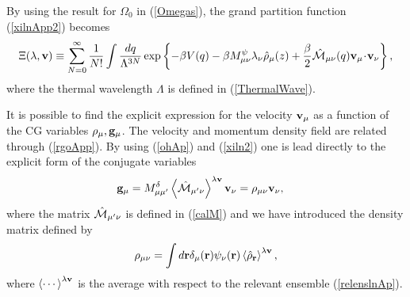 \documentclass[b5paper,openright,10pt]{book}
\newcommand{\esc}{\!\cdot\!}
\newcommand{\llangle}{\left\langle}
\newcommand{\rrangle}{\right\rangle}
\begin{document}
\begin{appendices}
By using the result for $\Omega_0$ in (\ref{Omegas}),  the  grand  partition  function
(\ref{xilnApp2}) becomes
\begin{align}
\Xi(\lambda,{\bf v})\equiv \sum_{N=0}^\infty \frac{1}{N!}
\int \frac{dq}{\Lambda^{3N}}
\exp\left\{-\beta V(q)-\beta M^\psi_{\mu\nu}\lambda_\nu\hat{\rho}_{\mu}(z)+\frac{\beta}{2}\hat{\cal M}_{\mu\nu}(q){\bf v}_\mu \esc{\bf v}_\nu
\right\},
\label{xiln2b}
\end{align}
where the thermal wavelength $\Lambda$ is  defined in (\ref{ThermalWave}).



It is possible to find the  explicit expression for the velocity ${\bf
  v}_\mu$ as  a function of  the CG variables  $\rho_\mu,{\bf g}_\mu$.
The  velocity   and  momentum   density  field  are   related  through
(\ref{rgoApp}).   By  using  (\ref{ohAp})  and (\ref{xiln2})  one  is  lead
directly to the explicit form of the conjugate variables
\begin{align}
{\bf g}_\mu&=M^\delta_{\mu\mu'}\llangle \hat{\cal M}_{\mu'\nu}\rrangle^{\lambda {\bf v}} {\bf v}_\nu =\rho_{\mu\nu}{\bf v}_\nu,
\label{nu2}
\end{align}
where the  matrix $\hat{\cal M}_{\mu'\nu}$ is  defined in (\ref{calM})
and we have introduced the density matrix defined by
\begin{align}
  \rho_{\mu\nu} =\int d{\bf r}
\delta_\mu({\bf r})\psi_\nu({\bf r})\llangle\hat{\rho}_{\bf r}\rrangle^{\lambda{\bf v}},
\end{align}
where $\llangle\cdots\rrangle^{\lambda{\bf v}}$  is the average  with respect
to   the  relevant   ensemble   (\ref{relenslnAp}). 


\end{appendices}
\end{document}
